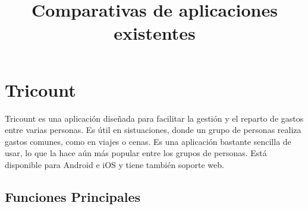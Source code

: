 \documentclass{article}
\title{Comparativas de aplicaciones existentes}
\author{}
\date{}
\begin{document}
\maketitle

\section{Tricount}

Tricount es una aplicación diseñada para facilitar la gestión y el reparto de gastos entre varias personas. Es útil en sistuaciones,
donde un grupo de personas realiza gastos comunes, como en viajes o cenas. Es una aplicación bastante sencilla de usar, lo que la 
hace aún más popular entre los grupos de personas. Está disponible para Android e iOS y tiene también soporte web. 

\subsection{Funciones Principales}
\end{document}
